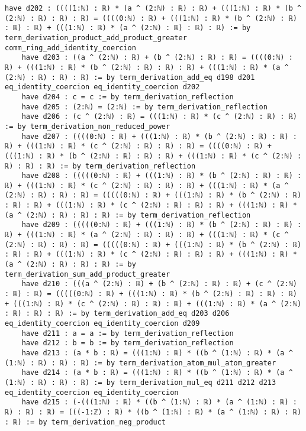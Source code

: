 \documentclass{article}
\begin{document}
\begin{tcolorbox}[colback=white!10, width=\linewidth]
\begin{lstlisting}[language=Lean4]
    have d202 : ((((1:ℕ) : ℝ) * (a ^ (2:ℕ) : ℝ) : ℝ) + (((1:ℕ) : ℝ) * (b ^ (2:ℕ) : ℝ) : ℝ) : ℝ) = ((((0:ℕ) : ℝ) + (((1:ℕ) : ℝ) * (b ^ (2:ℕ) : ℝ) : ℝ) : ℝ) + (((1:ℕ) : ℝ) * (a ^ (2:ℕ) : ℝ) : ℝ) : ℝ) := by term_derivation_product_add_product_greater comm_ring_add_identity_coercion
    have d203 : ((a ^ (2:ℕ) : ℝ) + (b ^ (2:ℕ) : ℝ) : ℝ) = ((((0:ℕ) : ℝ) + (((1:ℕ) : ℝ) * (b ^ (2:ℕ) : ℝ) : ℝ) : ℝ) + (((1:ℕ) : ℝ) * (a ^ (2:ℕ) : ℝ) : ℝ) : ℝ) := by term_derivation_add_eq d198 d201 eq_identity_coercion eq_identity_coercion d202
    have d204 : c = c := by term_derivation_reflection
    have d205 : (2:ℕ) = (2:ℕ) := by term_derivation_reflection
    have d206 : (c ^ (2:ℕ) : ℝ) = (((1:ℕ) : ℝ) * (c ^ (2:ℕ) : ℝ) : ℝ) := by term_derivation_non_reduced_power
    have d207 : ((((0:ℕ) : ℝ) + (((1:ℕ) : ℝ) * (b ^ (2:ℕ) : ℝ) : ℝ) : ℝ) + (((1:ℕ) : ℝ) * (c ^ (2:ℕ) : ℝ) : ℝ) : ℝ) = ((((0:ℕ) : ℝ) + (((1:ℕ) : ℝ) * (b ^ (2:ℕ) : ℝ) : ℝ) : ℝ) + (((1:ℕ) : ℝ) * (c ^ (2:ℕ) : ℝ) : ℝ) : ℝ) := by term_derivation_reflection
    have d208 : (((((0:ℕ) : ℝ) + (((1:ℕ) : ℝ) * (b ^ (2:ℕ) : ℝ) : ℝ) : ℝ) + (((1:ℕ) : ℝ) * (c ^ (2:ℕ) : ℝ) : ℝ) : ℝ) + (((1:ℕ) : ℝ) * (a ^ (2:ℕ) : ℝ) : ℝ) : ℝ) = (((((0:ℕ) : ℝ) + (((1:ℕ) : ℝ) * (b ^ (2:ℕ) : ℝ) : ℝ) : ℝ) + (((1:ℕ) : ℝ) * (c ^ (2:ℕ) : ℝ) : ℝ) : ℝ) + (((1:ℕ) : ℝ) * (a ^ (2:ℕ) : ℝ) : ℝ) : ℝ) := by term_derivation_reflection
    have d209 : (((((0:ℕ) : ℝ) + (((1:ℕ) : ℝ) * (b ^ (2:ℕ) : ℝ) : ℝ) : ℝ) + (((1:ℕ) : ℝ) * (a ^ (2:ℕ) : ℝ) : ℝ) : ℝ) + (((1:ℕ) : ℝ) * (c ^ (2:ℕ) : ℝ) : ℝ) : ℝ) = (((((0:ℕ) : ℝ) + (((1:ℕ) : ℝ) * (b ^ (2:ℕ) : ℝ) : ℝ) : ℝ) + (((1:ℕ) : ℝ) * (c ^ (2:ℕ) : ℝ) : ℝ) : ℝ) + (((1:ℕ) : ℝ) * (a ^ (2:ℕ) : ℝ) : ℝ) : ℝ) := by term_derivation_sum_add_product_greater
    have d210 : (((a ^ (2:ℕ) : ℝ) + (b ^ (2:ℕ) : ℝ) : ℝ) + (c ^ (2:ℕ) : ℝ) : ℝ) = (((((0:ℕ) : ℝ) + (((1:ℕ) : ℝ) * (b ^ (2:ℕ) : ℝ) : ℝ) : ℝ) + (((1:ℕ) : ℝ) * (c ^ (2:ℕ) : ℝ) : ℝ) : ℝ) + (((1:ℕ) : ℝ) * (a ^ (2:ℕ) : ℝ) : ℝ) : ℝ) := by term_derivation_add_eq d203 d206 eq_identity_coercion eq_identity_coercion d209
    have d211 : a = a := by term_derivation_reflection
    have d212 : b = b := by term_derivation_reflection
    have d213 : (a * b : ℝ) = (((1:ℕ) : ℝ) * ((b ^ (1:ℕ) : ℝ) * (a ^ (1:ℕ) : ℝ) : ℝ) : ℝ) := by term_derivation_atom_mul_atom_greater
    have d214 : (a * b : ℝ) = (((1:ℕ) : ℝ) * ((b ^ (1:ℕ) : ℝ) * (a ^ (1:ℕ) : ℝ) : ℝ) : ℝ) := by term_derivation_mul_eq d211 d212 d213 eq_identity_coercion eq_identity_coercion
    have d215 : (-(((1:ℕ) : ℝ) * ((b ^ (1:ℕ) : ℝ) * (a ^ (1:ℕ) : ℝ) : ℝ) : ℝ) : ℝ) = (((-1:ℤ) : ℝ) * ((b ^ (1:ℕ) : ℝ) * (a ^ (1:ℕ) : ℝ) : ℝ) : ℝ) := by term_derivation_neg_product

\end{lstlisting}
\end{tcolorbox}
\end{document}
